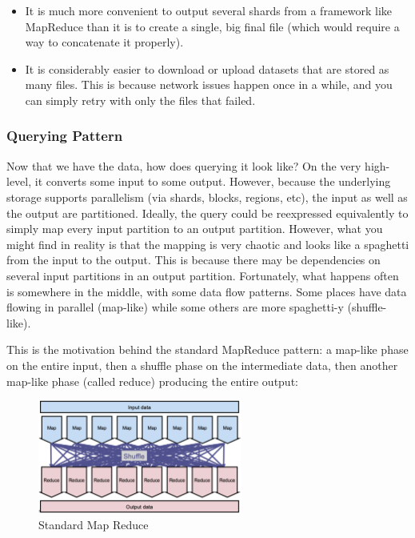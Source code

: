 \begin{itemize}
    \item It is much more convenient to output several shards from a framework like MapReduce than it is to create a single, big final file (which would require a way to concatenate it properly).
    \item It is considerably easier to download or upload datasets that are stored as many files. This is because network issues happen once in a while, and you can simply retry with only the files that failed.
\end{itemize}

\subsubsection{Querying Pattern}
Now that we have the data, how does querying it look like? On the very high-level, it converts some input to some output. However, because the underlying storage supports parallelism (via shards, blocks, regions, etc), the input as well as the output are partitioned. Ideally, the query could be reexpressed equivalently to simply map every input partition to an output partition. However, what you might find in reality is that the mapping is very chaotic and looks like a spaghetti from the input to the output. This is because there may be dependencies on several input partitions in an output partition. Fortunately, what happens often is somewhere in the middle, with some data flow patterns. Some places have data flowing in parallel (map-like) while some others are more spaghetti-y (shuffle-like).

This is the motivation behind the standard MapReduce pattern: a map-like phase on the entire input, then a shuffle phase on the intermediate data, then another map-like phase (called reduce) producing the entire output:

\begin{figure}[h]
    \centering
    \includegraphics[width=0.6\textwidth]{Figures/StandardMapReduce.png}
    \caption{Standard Map Reduce}\label{fig:StdMapRed}
\end{figure}

